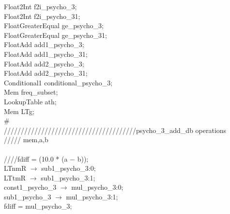 \hspace*{2em}Float2Int f2i\_psycho\_3; \\
\hspace*{2em}Float2Int f2i\_psycho\_31; \\
\hspace*{2em}FloatGreaterEqual ge\_psycho\_3; \\
\hspace*{2em}FloatGreaterEqual ge\_psycho\_31; \\
\hspace*{2em}FloatAdd add1\_psycho\_3; \\
\hspace*{2em}FloatAdd add1\_psycho\_31; \\
\hspace*{2em}FloatAdd add2\_psycho\_3; \\
\hspace*{2em}FloatAdd add2\_psycho\_31; \\
\hspace*{2em}Conditional1 conditional\_psycho\_3; \\
\hspace*{2em}Mem freq\_subset; \\
\hspace*{2em}LookupTable ath; \\
\hspace*{2em}Mem LTg; \\
\# \\
\hspace*{2em}///////////////////////////////////////psycho\_3\_add\_db operations \\
\hspace*{2em}///// mem,a,b \\
   \\
   \hspace*{2em}////fdiff = (10.0 * (a $-$ b)); \\
   \hspace*{2em}LTnmR $\rightarrow$ sub1\_psycho\_3:0; \\
   \hspace*{2em}LTtmR $\rightarrow$ sub1\_psycho\_3:1; \\
   \hspace*{2em}const1\_psycho\_3 $\rightarrow$ mul\_psycho\_3:0; \\
   \hspace*{2em}sub1\_psycho\_3 $\rightarrow$ mul\_psycho\_3:1; \\
   \hspace*{2em}fdiff = mul\_psycho\_3; \\
